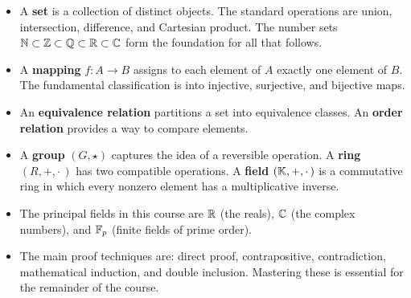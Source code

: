 \begin{itemize}
  \item A \textbf{set} is a collection of distinct objects. The standard
    operations are union, intersection, difference, and Cartesian product.
    The number sets ${\mathbb{N}}\subset{\mathbb{Z}}\subset{\mathbb{Q}}\subset{\mathbb{R}}\subset{\mathbb{C}}$ form the
    foundation for all that follows.

  \item A \textbf{mapping} $f\colon A\to B$ assigns to each element of
    $A$ exactly one element of $B$. The fundamental classification is into
    injective, surjective, and bijective maps.

  \item An \textbf{equivalence relation} partitions a set into
    equivalence classes. An \textbf{order relation} provides a way to
    compare elements.

  \item A \textbf{group} $(G,\star)$ captures the idea of a reversible
    operation. A \textbf{ring} $(R,+,\cdot\,)$ has two compatible
    operations. A \textbf{field} $({\mathbb{K}},+,\cdot\,)$ is a commutative ring
    in which every nonzero element has a multiplicative inverse.

  \item The principal fields in this course are ${\mathbb{R}}$ (the reals), ${\mathbb{C}}$
    (the complex numbers), and ${\mathbb{F}}_p$ (finite fields of prime order).

  \item The main proof techniques are: direct proof, contrapositive,
    contradiction, mathematical induction, and double inclusion. Mastering
    these is essential for the remainder of the course.
\end{itemize}
